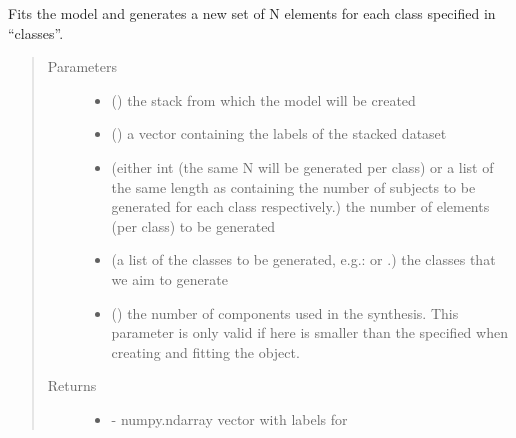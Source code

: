 \documentclass[letterpaper,10pt,english]{sphinxmanual}
\begin{document}
\begin{fulllineitems}
\begin{fulllineitems}
\end{fulllineitems}


\begin{fulllineitems}
\label{\detokenize{api:brainSimulator.BrainSimulator.generateDataset}}
Fits the model and generates a new set of N elements for each class
specified in “classes”.
\begin{quote}\begin{description}
\item[{Parameters}] \leavevmode\begin{itemize}
\item {} 
 () \textendash{} the stack from which the model will be created

\item {} 
 () \textendash{} a vector containing the labels of the stacked dataset

\item {} 
 (either int (the same N will be generated per class) or a list        of the same length as  containing the number of subjects to         be generated for each class respectively.) \textendash{} the number of elements (per class) to be generated

\item {} 
 (a list of the classes to be generated, e.g.: \sphinxtitleref{{[}0, 2{]}}         or \sphinxtitleref{{[}‘AD’, ‘CTL’{]}}.) \textendash{} the classes that we aim to generate

\item {} 
 () \textendash{} the number of components used in the synthesis.         This parameter is only valid if  here is smaller than the         specified when creating and fitting the         object.

\end{itemize}

\item[{Returns}] \leavevmode
\begin{itemize}
\item {} 
 - numpy.ndarray vector with labels for 


\end{itemize}
\end{description}
\end{quote}
\end{fulllineitems}
\end{fulllineitems}
\end{document}
